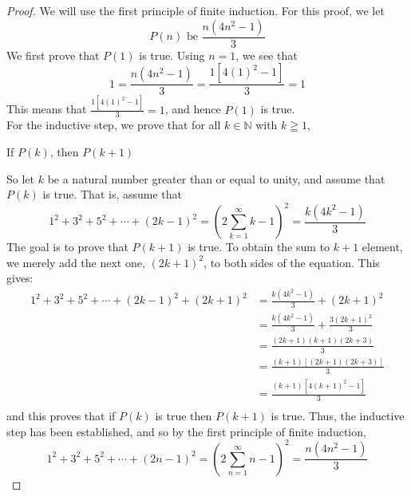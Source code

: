 \begin{example}
    \begin{proof}
        We will use the first principle of finite induction. For this proof, we let
            \begin{equation*}
                P(n) \text{ be } \frac{n(4n^2 - 1)}{3}
            \end{equation*}
        We first prove that $P(1)$ is true. Using $n=1$, we see that
            \begin{equation*}
                1 = \frac{n(4n^2 - 1)}{3} = \frac{1[4(1)^2 - 1]}{3} = 1
            \end{equation*}
        This means that $\frac{1[4(1)^2 - 1]}{3}=1$, and hence $P(1)$ is true. \\
        For the inductive step, we prove that for all $k \in \mathbb{N}$ with $k \geqq 1$, 
            \begin{center}
                If $P(k)$, then $P(k+1)$
            \end{center}
        So let $k$ be a natural number greater than or equal to unity, and assume that $P(k)$ is true. That is, assume that 
            \begin{equation*}
               1^2 + 3^2 + 5^2  + \cdots + (2k - 1)^2 = (2\sum_{k=1}^{\infty}{k} - 1)^2 = \frac{k(4k^2 - 1)}{3}
            \end{equation*}
        The goal is to prove that $P(k+1)$ is true. To obtain the sum to $k+1$ element, we merely add the next one, $(2k + 1)^2$, to both sides of the equation. This gives: 
            \begin{align*}
                1^2 + 3^2 + 5^2  + \cdots + (2k - 1)^2 + (2k + 1)^2 & = \frac{k(4k^2 - 1)}{3} + (2k + 1)^2 \\
                    & = \frac{k(4k^2 - 1)}{3} + \frac{3(2k + 1)^2}{3} \\
                    & = \frac{(2k+1)(k+1)(2k+3)}{3} \\
                    & = \frac{(k+1)[(2k+1)(2k+3)]}{3} \\
                    & = \frac{(k+1)[4(k+1)^2 - 1]}{3} \\
            \end{align*}
        and this proves that if $P(k)$ is true then $P(k+1)$ is true. Thus, the inductive step has been established, and so by the first principle of finite induction,
            \begin{equation*}
                 1^2 + 3^2 + 5^2  + \cdots + (2n - 1)^2 = (2\sum_{n=1}^{\infty}{n} - 1)^2 = \frac{n(4n^2 - 1)}{3}
            \end{equation*}
    \end{proof}
\end{example}


